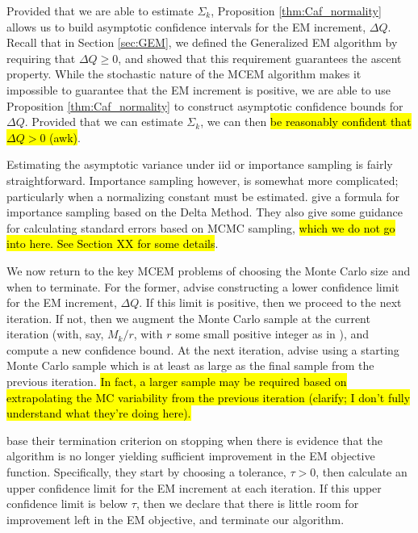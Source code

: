 \documentclass[11pt, oneside]{article}   	%
\begin{document}
Provided that we are able to estimate $\Sigma_k$, Proposition \ref{thm:Caf_normality} allows us to build asymptotic confidence intervals for the EM increment, $\Delta Q$. Recall that in Section \ref{sec:GEM}, we defined the Generalized EM algorithm by requiring that $\Delta Q \geq 0$, and showed that this requirement guarantees the ascent property. While the stochastic nature of the MCEM algorithm makes it impossible to guarantee that the EM increment is positive, we are able to use Proposition \ref{thm:Caf_normality} to construct asymptotic confidence bounds for $\Delta Q$. Provided that we can estimate $\Sigma_k$, we can then \hl{be reasonably confident that $\Delta Q > 0$ (awk)}.

Estimating the asymptotic variance under iid or importance sampling is fairly straightforward. Importance sampling however, is somewhat more complicated; particularly when a normalizing constant must be estimated. \citeauthor{Caf05} give a formula for importance sampling based on the Delta Method. They also give some guidance for calculating standard errors based on MCMC sampling, \hl{which we do not go into here. See Section XX for some details}. 

We now return to the key MCEM problems of choosing the Monte Carlo size and when to terminate. For the former, \citeauthor{Caf05} advise constructing a lower confidence limit for the EM increment, $\Delta Q$. If this limit is positive, then we proceed to the next iteration. If not, then we augment the Monte Carlo sample at the current iteration (with, say, $M_k/r$, with $r$ some small positive integer as in \citealp{Boo99}), and compute a new confidence bound. At the next iteration, \citeauthor{Caf05} advise using a starting Monte Carlo sample which is at least as large as the final sample from the previous iteration. \hl{In fact, a larger sample may be required based on extrapolating the MC variability from the previous iteration (clarify; I don't fully understand what they're doing here).}

\citeauthor{Caf05} base their termination criterion on stopping when there is evidence that the algorithm is no longer yielding sufficient improvement in the EM objective function. Specifically, they start by choosing a tolerance, $\tau>0$, then calculate an upper confidence limit for the EM increment at each iteration. If this upper confidence limit is below $\tau$, then we declare that there is little room for improvement left in the EM objective, and terminate our algorithm.
\end{document}
